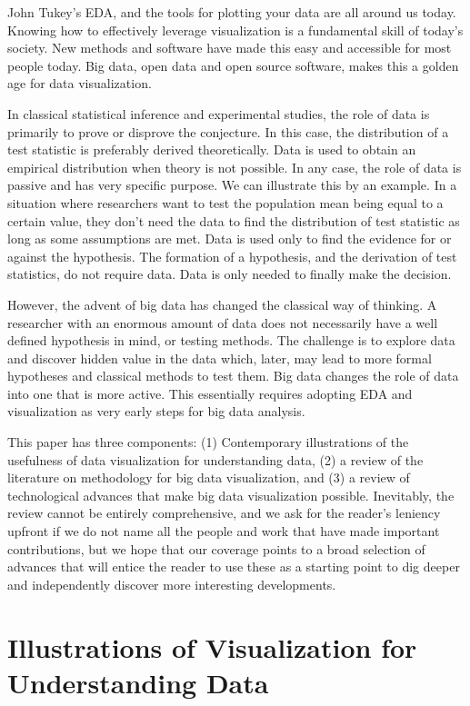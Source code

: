 \documentclass{article}
\begin{document}
John Tukey's EDA, and the tools for plotting your data are all around us today. Knowing how to effectively leverage visualization is a fundamental skill of today's society. New methods and software have made this easy and accessible for most people today. Big data, open data and open source software, makes this a golden age for data visualization.

In classical statistical inference and experimental studies, the role of data is primarily to prove or disprove the conjecture. In this case, the distribution of a test statistic is preferably derived theoretically. Data is used to obtain an empirical distribution when theory is not possible. In any case, the role of data is passive and has very specific purpose. We can illustrate this by an example. In a situation where researchers want to test the population mean being equal to a certain value, they don't need the data to find the distribution of test statistic as long as some assumptions are met. Data is used only to find the evidence for or against the hypothesis. The formation of a hypothesis, and the derivation of test statistics, do not require data. Data is only needed to finally make the decision.

However, the advent of big data has changed the classical way of thinking. A researcher with an enormous amount of data does not necessarily have a well defined hypothesis in mind, or testing methods. The challenge is to explore data and discover hidden value in the data which, later, may lead to more formal hypotheses and classical methods to test them. Big data changes the role of data into one that is more active. This essentially requires adopting EDA and visualization as very early steps for big data analysis.

This paper has three components: (1) Contemporary illustrations of the usefulness of data visualization for understanding data, (2) a review of the literature on methodology for big data visualization, and (3) a review of technological advances that make big data visualization possible. Inevitably, the review cannot be entirely comprehensive, and we ask for the reader's leniency upfront if we do not name all the people and work that have made important contributions, but we hope that our coverage points to a broad selection of advances that will entice the reader to use these as a starting point to dig deeper and independently discover more interesting developments.

\section{Illustrations of Visualization for Understanding Data}
\end{document}
